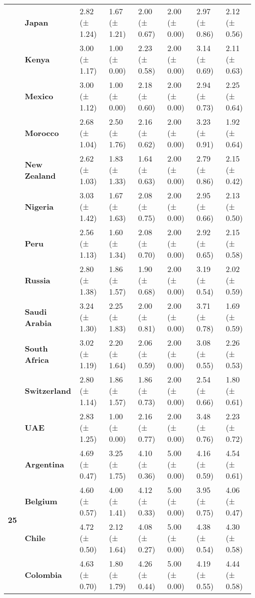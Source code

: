 \begin{longtable}{llllllll}
\textbf{} & \textbf{Japan} & 2.82 (± 1.24) & 1.67 (± 1.21) & 2.00 (± 0.67) & 2.00 (± 0.00) & 2.97 (± 0.86) & 2.12 (± 0.56) \\
\textbf{} & \textbf{Kenya} & 3.00 (± 1.17) & 1.00 (± 0.00) & 2.23 (± 0.58) & 2.00 (± 0.00) & 3.14 (± 0.69) & 2.11 (± 0.63) \\
\textbf{} & \textbf{Mexico} & 3.00 (± 1.12) & 1.00 (± 0.00) & 2.18 (± 0.60) & 2.00 (± 0.00) & 2.94 (± 0.73) & 2.25 (± 0.64) \\
\textbf{} & \textbf{Morocco} & 2.68 (± 1.04) & 2.50 (± 1.76) & 2.16 (± 0.62) & 2.00 (± 0.00) & 3.23 (± 0.91) & 1.92 (± 0.64) \\
\textbf{} & \textbf{New Zealand} & 2.62 (± 1.03) & 1.83 (± 1.33) & 1.64 (± 0.63) & 2.00 (± 0.00) & 2.79 (± 0.86) & 2.15 (± 0.42) \\
\textbf{} & \textbf{Nigeria} & 3.03 (± 1.42) & 1.67 (± 1.63) & 2.08 (± 0.75) & 2.00 (± 0.00) & 2.95 (± 0.66) & 2.13 (± 0.50) \\
\textbf{} & \textbf{Peru} & 2.56 (± 1.13) & 1.60 (± 1.34) & 2.08 (± 0.70) & 2.00 (± 0.00) & 2.92 (± 0.65) & 2.15 (± 0.58) \\
\textbf{} & \textbf{Russia} & 2.80 (± 1.38) & 1.86 (± 1.57) & 1.90 (± 0.68) & 2.00 (± 0.00) & 3.19 (± 0.54) & 2.02 (± 0.59) \\
\textbf{} & \textbf{Saudi Arabia} & 3.24 (± 1.30) & 2.25 (± 1.83) & 2.00 (± 0.81) & 2.00 (± 0.00) & 3.71 (± 0.78) & 1.69 (± 0.59) \\
\textbf{} & \textbf{South Africa} & 3.02 (± 1.19) & 2.20 (± 1.64) & 2.06 (± 0.59) & 2.00 (± 0.00) & 3.08 (± 0.55) & 2.26 (± 0.53) \\
\textbf{} & \textbf{Switzerland} & 2.80 (± 1.14) & 1.86 (± 1.57) & 1.86 (± 0.73) & 2.00 (± 0.00) & 2.54 (± 0.66) & 1.80 (± 0.61) \\
\textbf{} & \textbf{UAE} & 2.83 (± 1.25) & 1.00 (± 0.00) & 2.16 (± 0.77) & 2.00 (± 0.00) & 3.48 (± 0.76) & 2.23 (± 0.72) \\
\cline{1-8}
\multirow[t]{19}{*}{\textbf{25}} & \textbf{Argentina} & 4.69 (± 0.47) & 3.25 (± 1.75) & 4.10 (± 0.36) & 5.00 (± 0.00) & 4.16 (± 0.59) & 4.54 (± 0.61) \\
\textbf{} & \textbf{Belgium} & 4.60 (± 0.57) & 4.00 (± 1.41) & 4.12 (± 0.33) & 5.00 (± 0.00) & 3.95 (± 0.75) & 4.06 (± 0.47) \\
\textbf{} & \textbf{Chile} & 4.72 (± 0.50) & 2.12 (± 1.64) & 4.08 (± 0.27) & 5.00 (± 0.00) & 4.38 (± 0.54) & 4.30 (± 0.58) \\
\textbf{} & \textbf{Colombia} & 4.63 (± 0.70) & 1.80 (± 1.79) & 4.26 (± 0.44) & 5.00 (± 0.00) & 4.19 (± 0.55) & 4.44 (± 0.58) \\

\end{longtable}
